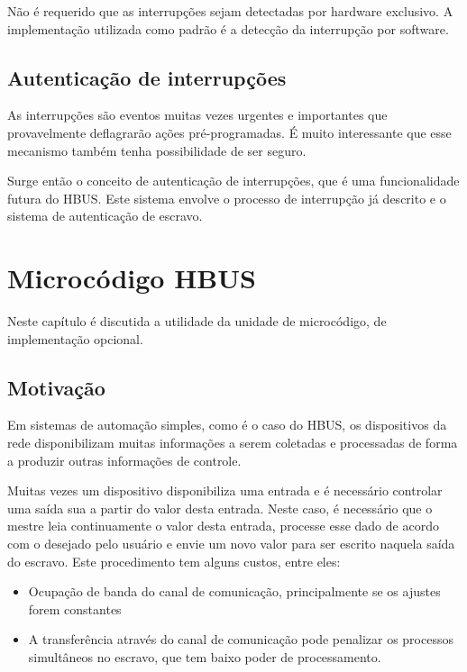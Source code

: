\documentclass[11pt]{report}
\begin{document}
Não é requerido que as interrupções sejam detectadas por hardware exclusivo. A implementação utilizada como padrão é a detecção da interrupção por software.

\section{Autenticação de interrupções}

As interrupções são eventos muitas vezes urgentes e importantes que provavelmente deflagrarão ações pré-programadas. É muito interessante que esse mecanismo também tenha possibilidade de ser seguro.

Surge então o conceito de autenticação de interrupções, que é uma funcionalidade futura do HBUS. Este sistema envolve o processo de interrupção já descrito e o sistema de autenticação de escravo.

\chapter{Microcódigo HBUS}

Neste capítulo é discutida a utilidade da unidade de microcódigo, de implementação opcional.

\section{Motivação}

Em sistemas de automação simples, como é o caso do HBUS, os dispositivos da rede disponibilizam muitas informações a serem coletadas e processadas de forma a produzir outras informações de controle.

Muitas vezes um dispositivo disponibiliza uma entrada e é necessário controlar uma saída sua a partir do valor desta entrada. Neste caso, é necessário que o mestre leia continuamente o valor desta entrada, processe esse dado de acordo com o desejado pelo usuário e envie um novo valor para ser escrito naquela saída do escravo. Este procedimento tem alguns custos, entre eles:

\begin{itemize}
\item Ocupação de banda do canal de comunicação, principalmente se os ajustes forem constantes
\item A transferência através do canal de comunicação pode penalizar os processos simultâneos no escravo, que tem baixo poder de processamento.
\end{itemize}
\end{document}
